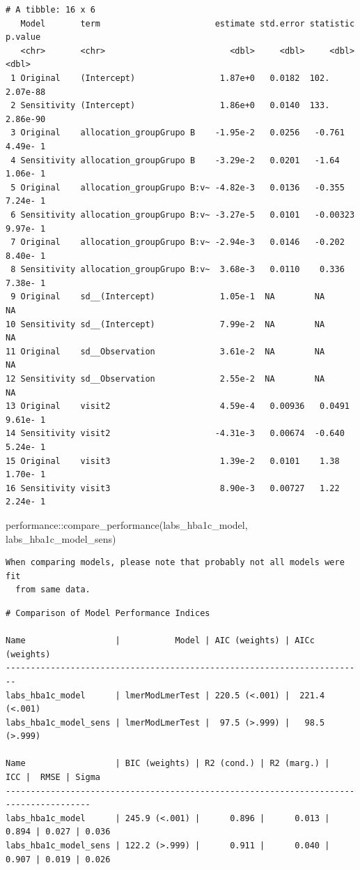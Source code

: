 \documentclass[
  letterpaper,
  DIV=11,
  numbers=noendperiod]{scrartcl}
\newenvironment{Shaded}{\begin{snugshade}}{\end{snugshade}}
\newcommand{\FunctionTok}[1]{\textcolor[rgb]{0.28,0.35,0.67}{#1}}
\newcommand{\NormalTok}[1]{\textcolor[rgb]{0.00,0.23,0.31}{#1}}
\newcommand{\SpecialCharTok}[1]{\textcolor[rgb]{0.37,0.37,0.37}{#1}}
\begin{document}
\begin{verbatim}
# A tibble: 16 x 6
   Model       term                       estimate std.error statistic   p.value
   <chr>       <chr>                         <dbl>     <dbl>     <dbl>     <dbl>
 1 Original    (Intercept)                 1.87e+0   0.0182  102.       2.07e-88
 2 Sensitivity (Intercept)                 1.86e+0   0.0140  133.       2.86e-90
 3 Original    allocation_groupGrupo B    -1.95e-2   0.0256   -0.761    4.49e- 1
 4 Sensitivity allocation_groupGrupo B    -3.29e-2   0.0201   -1.64     1.06e- 1
 5 Original    allocation_groupGrupo B:v~ -4.82e-3   0.0136   -0.355    7.24e- 1
 6 Sensitivity allocation_groupGrupo B:v~ -3.27e-5   0.0101   -0.00323  9.97e- 1
 7 Original    allocation_groupGrupo B:v~ -2.94e-3   0.0146   -0.202    8.40e- 1
 8 Sensitivity allocation_groupGrupo B:v~  3.68e-3   0.0110    0.336    7.38e- 1
 9 Original    sd__(Intercept)             1.05e-1  NA        NA       NA       
10 Sensitivity sd__(Intercept)             7.99e-2  NA        NA       NA       
11 Original    sd__Observation             3.61e-2  NA        NA       NA       
12 Sensitivity sd__Observation             2.55e-2  NA        NA       NA       
13 Original    visit2                      4.59e-4   0.00936   0.0491   9.61e- 1
14 Sensitivity visit2                     -4.31e-3   0.00674  -0.640    5.24e- 1
15 Original    visit3                      1.39e-2   0.0101    1.38     1.70e- 1
16 Sensitivity visit3                      8.90e-3   0.00727   1.22     2.24e- 1
\end{verbatim}

\begin{Shaded}
\begin{Highlighting}[]
\NormalTok{performance}\SpecialCharTok{::}\FunctionTok{compare\_performance}\NormalTok{(labs\_hba1c\_model, labs\_hba1c\_model\_sens)}
\end{Highlighting}
\end{Shaded}

\begin{verbatim}
When comparing models, please note that probably not all models were fit
  from same data.
\end{verbatim}

\begin{verbatim}
# Comparison of Model Performance Indices

Name                  |           Model | AIC (weights) | AICc (weights)
------------------------------------------------------------------------
labs_hba1c_model      | lmerModLmerTest | 220.5 (<.001) |  221.4 (<.001)
labs_hba1c_model_sens | lmerModLmerTest |  97.5 (>.999) |   98.5 (>.999)

Name                  | BIC (weights) | R2 (cond.) | R2 (marg.) |   ICC |  RMSE | Sigma
---------------------------------------------------------------------------------------
labs_hba1c_model      | 245.9 (<.001) |      0.896 |      0.013 | 0.894 | 0.027 | 0.036
labs_hba1c_model_sens | 122.2 (>.999) |      0.911 |      0.040 | 0.907 | 0.019 | 0.026
\end{verbatim}
\end{document}
